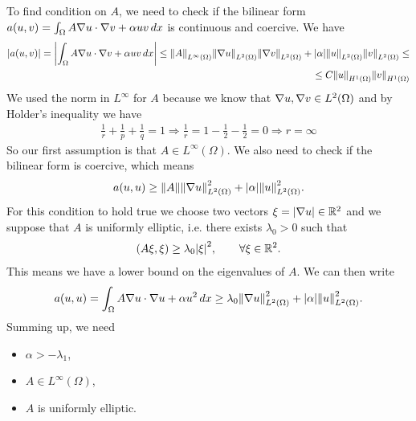     To find condition on \(A\), we need to check if the bilinear form \(a(u, v) = \int_\Omega A \nabla u \cdot \nabla v + \alpha u v \, dx\) is continuous and coercive. We have
    \[
        \begin{split}
            |a(u, v)| = \left|\int_\Omega A \nabla u \cdot \nabla v + \alpha u v \, dx\right| \leq \norm{A}_{L^\infty(\Omega)} \norm{\nabla u}_{L^2(\Omega)} \norm{\nabla v}_{L^2(\Omega)} + \abs{\alpha} \norm{u}_{L^2(\Omega)} \norm{v}_{L^2(\Omega)} \leq \\
            \leq C \norm{u}_{H^1(\Omega)} \norm{v}_{H^1(\Omega)}
        \end{split}
    \]
    We used the norm in \(L^\infty\) for \(A\) because we know that \(\nabla u, \nabla v \in L^2(\Omega)\) and by Holder's inequality we have
    \[
        \begin{split}
            \frac{1}{r} + \frac{1}{p} + \frac{1}{q} = 1 \Rightarrow \frac{1}{r} = 1 - \frac{1}{2} - \frac{1}{2} = 0 \Rightarrow r = \infty
        \end{split}
    \]
    So our first assumption is that \(A \in L^\infty(\Omega)\). We also need to check if the bilinear form is coercive, which means 
    \[
        \begin{split}
            a(u, u) \geq \norm{A} \norm{\nabla u}_{L^2(\Omega)}^2 + \abs{\alpha} \norm{u}_{L^2(\Omega)}^2.
        \end{split}
    \]
    For this condition to hold true we choose two vectors \(\xi = \abs{\nabla u} \in \mathbb{R}^2\) and we suppose that \(A\) is uniformly elliptic, i.e. there exists \(\lambda_0 > 0\) such that
    \[
        \begin{split}
            (A\xi, \xi) \geq \lambda_0 \abs{\xi}^2, \qquad \forall \xi \in \mathbb{R}^2.
        \end{split}
    \]
    This means we have a lower bound on the eigenvalues of \(A\). We can then write
    \[
        \begin{split}
            a(u, u) = \int_\Omega A \nabla u \cdot \nabla u + \alpha u^2 \, dx \geq \lambda_0 \norm{\nabla u}_{L^2(\Omega)}^2 + \abs{\alpha} \norm{u}_{L^2(\Omega)}^2.
        \end{split}
    \]
    Summing up, we need 
    \begin{itemize}
        \item \(\alpha > -\lambda_1\),
        \item \(A \in L^\infty(\Omega)\),
        \item \(A\) is uniformly elliptic.
    \end{itemize}

